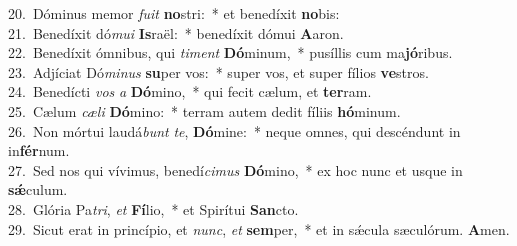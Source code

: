 {20.~}Dóminus memor \textit{fu}\textit{it} \textbf{no}stri:~* et benedíxit \textbf{no}bis:\\
{21.~}Benedíxit dó\textit{mu}\textit{i} \textbf{Is}raël:~* benedíxit dómui \textbf{A}aron.\\
{22.~}Benedíxit ómnibus, qui \textit{ti}\textit{ment} \textbf{Dó}minum,~* pusíllis cum ma\textbf{jó}ribus.\\
{23.~}Adjíciat Dó\textit{mi}\textit{nus} \textbf{su}per vos:~* super vos, et super fílios \textbf{ve}stros.\\
{24.~}Benedícti \textit{vos} \textit{a} \textbf{Dó}mino,~* qui fecit cælum, et \textbf{ter}ram.\\
{25.~}Cælum \textit{cæ}\textit{li} \textbf{Dó}mino:~* terram autem dedit fíliis \textbf{hó}minum.\\
{26.~}Non mórtui laudá\textit{bunt} \textit{te}, \textbf{Dó}mine:~* neque omnes, qui descéndunt in in\textbf{fér}num.\\
{27.~}Sed nos qui vívimus, benedí\textit{ci}\textit{mus} \textbf{Dó}mino,~* ex hoc nunc et usque in \textbf{sǽ}culum.\\
{28.~}Glória Pa\textit{tri}, \textit{et} \textbf{Fí}lio,~* et Spirítui \textbf{San}cto.\\
{29.~}Sicut erat in princípio, et \textit{nunc}, \textit{et} \textbf{sem}per,~* et in sǽcula sæculórum. \textbf{A}men.\\
